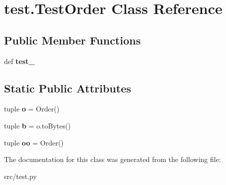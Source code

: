 \hypertarget{classtest_1_1_test_order}{\section{test.\-Test\-Order \-Class \-Reference}
\label{classtest_1_1_test_order}
}
\subsection*{\-Public \-Member \-Functions}
\begin{DoxyCompactItemize}
\item 
\hypertarget{classtest_1_1_test_order_a3d56be2de858998e14172a9dd6ff5fe4}{def {\bfseries test\-\_\-}}\label{classtest_1_1_test_order_a3d56be2de858998e14172a9dd6ff5fe4}

\end{DoxyCompactItemize}
\subsection*{\-Static \-Public \-Attributes}
\begin{DoxyCompactItemize}
\item 
\hypertarget{classtest_1_1_test_order_a2935afd2f861642116f4076c9c260de6}{tuple {\bfseries o} = \-Order()}\label{classtest_1_1_test_order_a2935afd2f861642116f4076c9c260de6}

\item 
\hypertarget{classtest_1_1_test_order_ab1f28e7686e62878c934ef911aae8ba4}{tuple {\bfseries b} = o.\-to\-Bytes()}\label{classtest_1_1_test_order_ab1f28e7686e62878c934ef911aae8ba4}

\item 
\hypertarget{classtest_1_1_test_order_a8b82b9b5a8a4f5b385348774c3ca364e}{tuple {\bfseries oo} = \-Order()}\label{classtest_1_1_test_order_a8b82b9b5a8a4f5b385348774c3ca364e}

\end{DoxyCompactItemize}


\-The documentation for this class was generated from the following file\-:\begin{DoxyCompactItemize}
\item 
src/test.\-py\end{DoxyCompactItemize}
